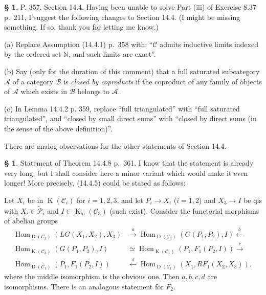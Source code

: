 \documentclass[12pt]{article}%
\theoremstyle{remark}
\theoremstyle{definition}
\newtheorem{s}[thm]{\S}%
\newcommand{\mc}{\mathcal}
\newcommand{\bb}{\mathbb}
\newcommand{\oo}{\operatorname}
\newcommand{\A}{\mathcal A}
\newcommand{\B}{\mathcal B}
\newcommand{\C}{\mathcal C}
\newcommand{\xr}{\xrightarrow}
\DeclareMathOperator{\Hom}{Hom}%
\begin{document}
%

\begin{s}%
P. 357, Section 14.4. Having been unable to solve Part (iii) of Exercise 8.37 p.~211, I suggest the following changes to Section 14.4. (I might be missing something. If so, thank you for letting me know.)

\noindent(a) Replace Assumption (14.4.1) p.~358 with: ``$\C$ admits inductive limits indexed by the ordered set $\bb N$, and such limits are exact''.

\noindent(b) Say (only for the duration of this comment) that a full saturated subcategory $\A$ of a category $\B$ is {\em closed by coproducts} if the coproduct of any family of objects of $\A$ which exists in $\B$ belongs to $\A$.

\noindent(c) In Lemma 14.4.2 p. 359, replace ``full triangulated'' with ``full saturated triangulated'', and ``closed by small direct sums'' with ``closed by direct sums (in the sense of the above definition)''. 

There are analog observations for the other statements of Section 14.4.
\end{s}

%

\begin{s}%
Statement of Theorem 14.4.8 p.~361. I know that the statement is already very long, but I shall consider here a minor variant which would make it even longer! More precisely, (14.4.5) could be stated as follows:

Let $X_i$ be in $\oo K(\C_i)$ for $i=1,2,3$, and let $P_i\to X_i$ ($i=1,2$) and $X_3\to I$ be qis with $X_i\in\widetilde{\mc P}_i$ and $I\in\oo K_{\oo{hi}}(\C_3)$ (such exist). Consider the functorial morphisms of abelian groups
\begin{equation}\label{1448}
\begin{split}
\Hom_{\oo D(\C_3)}(LG(X_1,X_2),X_3)&\xr a\Hom_{\oo D(\C_3)}(G(P_1,P_2),I)\xleftarrow b\\ 
\Hom_{\oo K(\C_3)}(G(P_1,P_2),I)&\simeq\Hom_{\oo K(\C_1)}(P_1,F_1(P_2,I))\xr c\\ 
\Hom_{\oo D(\C_1)}(P_1,F_1(P_2,I))&\xleftarrow d\Hom_{\oo D(\C_1)}(X_1,RF_1(X_2,X_3)),
\end{split}
\end{equation}
where the middle isomorphism is the obvious one. Then $a,b,c,d$ are isomorphisms. There is an analogous statement for $F_2$.
\end{s}
\end{document}
